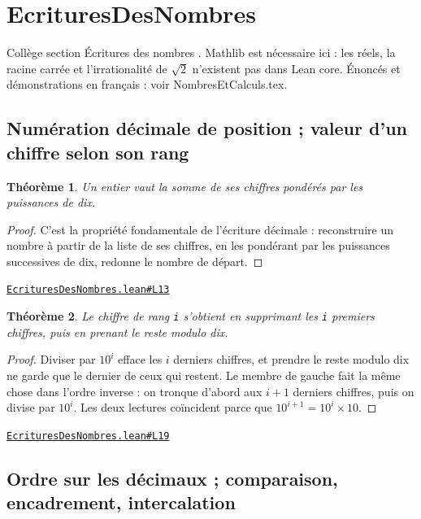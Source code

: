 \documentclass[11pt,a4paper]{article}
\theoremstyle{definition}
\theoremstyle{plain}
\newtheorem{theoreme}{Théorème}
\newcommand{\source}[2]{\par\smallskip\noindent\hfill{\footnotesize\href{#1}{\texttt{#2}}}\par\smallskip}
\begin{document}
\section{EcrituresDesNombres}

\noindent
Collège \textemdash{} section \og{} Écritures des nombres \fg{}. Mathlib est nécessaire ici : les réels,
la racine carrée et l'irrationalité de \(\sqrt{2}\) n'existent pas dans Lean core.
Énoncés et démonstrations en français : voir NombresEtCalculs.tex.

\subsection{Numération décimale de position ; valeur d'un chiffre selon son rang}

\begin{theoreme}
Un entier vaut la somme de ses chiffres pondérés par les puissances de dix.
\end{theoreme}

\begin{proof}
C'est la propriété fondamentale de l'écriture décimale : reconstruire un nombre à
partir de la liste de ses chiffres, en les pondérant par les puissances successives de dix,
redonne le nombre de départ.
\end{proof}
\source{https://github.com/Commutator-IO/learn-lean/blob/main/courses/01-college/01-nombres-et-calculs/EcrituresDesNombres.lean\#L13}{EcrituresDesNombres.lean\#L13}

\begin{theoreme}
Le chiffre de rang \texttt{i} s'obtient en supprimant les \texttt{i} premiers chiffres, puis en
prenant le reste modulo dix.
\end{theoreme}

\begin{proof}
Diviser par $10^i$ efface les $i$ derniers chiffres, et prendre le reste modulo dix
ne garde que le dernier de ceux qui restent. Le membre de gauche fait la même chose dans
l'ordre inverse : on tronque d'abord aux $i+1$ derniers chiffres, puis on divise par $10^i$.
Les deux lectures coïncident parce que $10^{i+1} = 10^i \times 10$.
\end{proof}
\source{https://github.com/Commutator-IO/learn-lean/blob/main/courses/01-college/01-nombres-et-calculs/EcrituresDesNombres.lean\#L19}{EcrituresDesNombres.lean\#L19}

\subsection{Ordre sur les décimaux ; comparaison, encadrement, intercalation}
\end{document}
